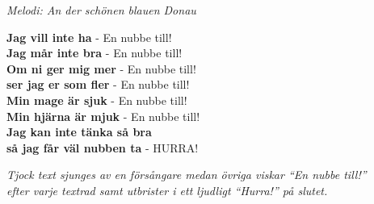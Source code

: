 {\footnotesize\textit{Melodi: An der schönen blauen Donau}}\par
\vspace{10pt}
\textbf{Jag vill inte ha} - En nubbe till!\\
\textbf{Jag mår inte bra} - En nubbe till!\\
\textbf{Om ni ger mig mer} - En nubbe till!\\
\textbf{ser jag er som fler} - En nubbe till!\\
\textbf{Min mage är sjuk} - En nubbe till!\\
\textbf{Min hjärna är mjuk} - En nubbe till!\\
\textbf{Jag kan inte tänka så bra}\\
\textbf{så jag får väl nubben ta} - HURRA!\par
\vspace{10pt}
{\footnotesize\textit{Tjock text sjunges av en försångare medan övriga viskar ``En nubbe till!''\\ efter varje textrad samt utbrister i ett ljudligt ``Hurra!'' på slutet.}}
